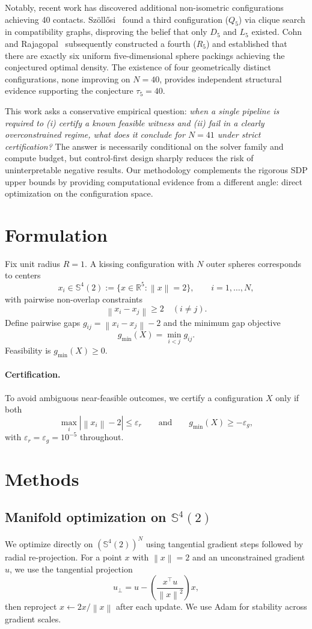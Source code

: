 \documentclass[11pt]{article}
\newcommand{\R}{\mathbb{R}}
\newcommand{\Sn}[1]{\mathbb{S}^{#1}}
\newcommand{\norm}[1]{\left\lVert #1 \right\rVert}
\begin{document}
Notably, recent work has discovered additional non-isometric configurations achieving 40 contacts. Sz\"{o}ll\H{o}si~\cite{Szollosi2023} found a third configuration ($Q_5$) via clique search in compatibility graphs, disproving the belief that only $D_5$ and $L_5$ existed. Cohn and Rajagopal~\cite{CohnRajagopal2024} subsequently constructed a fourth ($R_5$) and established that there are exactly six uniform five-dimensional sphere packings achieving the conjectured optimal density. The existence of four geometrically distinct configurations, none improving on $N=40$, provides independent structural evidence supporting the conjecture $\tau_5=40$.

This work asks a conservative empirical question: \emph{when a single pipeline is required to (i) certify a known feasible witness and (ii) fail in a clearly overconstrained regime, what does it conclude for $N=41$ under strict certification?}
The answer is necessarily conditional on the solver family and compute budget, but control-first design sharply reduces the risk of uninterpretable negative results. Our methodology complements the rigorous SDP upper bounds by providing computational evidence from a different angle: direct optimization on the configuration space.

\section{Formulation}
Fix unit radius $R=1$. A kissing configuration with $N$ outer spheres corresponds to centers
\[
x_i \in \Sn{4}(2) := \{x\in \R^5:\norm{x}=2\}, \qquad i=1,\dots,N,
\]
with pairwise non-overlap constraints
\[
\norm{x_i-x_j} \ge 2 \quad (i\ne j).
\]
Define pairwise gaps $g_{ij}=\norm{x_i-x_j}-2$ and the minimum gap objective
\[
g_{\min}(X) = \min_{i<j} g_{ij}.
\]
Feasibility is $g_{\min}(X)\ge 0$.

\paragraph{Certification.}
To avoid ambiguous near-feasible outcomes, we certify a configuration $X$ only if both
\[
\max_i \left|\norm{x_i}-2\right| \le \varepsilon_r
\qquad\text{and}\qquad
g_{\min}(X)\ge -\varepsilon_g,
\]
with $\varepsilon_r=\varepsilon_g=10^{-5}$ throughout.

\section{Methods}
\subsection{Manifold optimization on $\Sn{4}(2)$}
We optimize directly on $(\Sn{4}(2))^N$ using tangential gradient steps followed by radial re-projection.
For a point $x$ with $\norm{x}=2$ and an unconstrained gradient $u$, we use the tangential projection
\[
u_{\perp} = u - \left(\frac{x^\top u}{\norm{x}^2}\right) x,
\]
then reproject $x\leftarrow 2x/\norm{x}$ after each update. We use Adam for stability across gradient scales.
\end{document}
